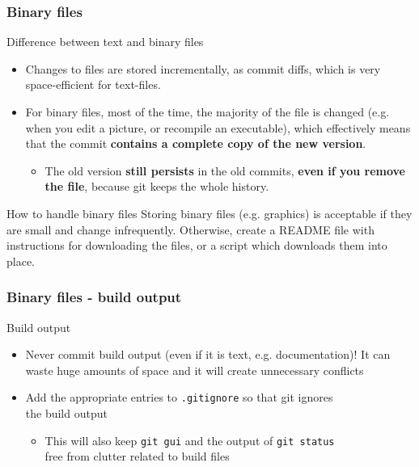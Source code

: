
\begin{frame}
	\frametitle{Binary files}
	
	\begin{block}{Difference between text and binary files}
	\begin{itemize}
	\item Changes to files are stored incrementally, as commit diffs, which is very space-efficient for text-files.
    \item For binary files, most of the time, the majority of the file is changed (e.g. when you edit a picture, or recompile an executable), which effectively means that the commit \textbf{contains a complete copy of the new version}.
    \begin{itemize}
    \item The old version \textbf{still persists} in the old commits, \textbf{even if you remove the file}, because git keeps the whole history.
    \end{itemize}
    \end{itemize}
	\end{block}
	
	\begin{block}{How to handle binary files}
	Storing binary files (e.g. graphics) is acceptable if they are small and change infrequently. Otherwise, create a README file with instructions for downloading the files, or a script which downloads them into place.
	\end{block}
\end{frame}


\begin{frame}[fragile]
	\frametitle{Binary files - build output}
	
	\begin{block}{Build output}
	\begin{itemize}
	\item \alert{Never} commit build output (even if it is text, e.g. documentation)! It can waste \alert{huge} amounts of space and it will create unnecessary conflicts
	\item Add the appropriate entries to \texttt{.gitignore} so that git ignores \\ the build output
	\begin{itemize}
	\item This will also keep \texttt{git gui} and the output of \texttt{git status}\\ free from clutter related to build files
	\end{itemize}
	\end{itemize}
	\end{block}
\end{frame}